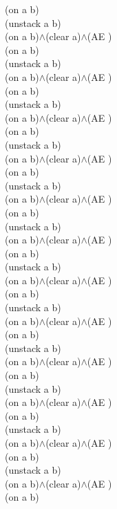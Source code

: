 {{(on a b)\\
(unstack a b)\\
(on a b)$\wedge$(clear a)$\wedge$(AE )\\
(on a b)\\
(unstack a b)\\
(on a b)$\wedge$(clear a)$\wedge$(AE )\\
(on a b)\\
(unstack a b)\\
(on a b)$\wedge$(clear a)$\wedge$(AE )\\
(on a b)\\
(unstack a b)\\
(on a b)$\wedge$(clear a)$\wedge$(AE )\\
(on a b)\\
(unstack a b)\\
(on a b)$\wedge$(clear a)$\wedge$(AE )\\
(on a b)\\
(unstack a b)\\
(on a b)$\wedge$(clear a)$\wedge$(AE )\\
(on a b)\\
(unstack a b)\\
(on a b)$\wedge$(clear a)$\wedge$(AE )\\
(on a b)\\
(unstack a b)\\
(on a b)$\wedge$(clear a)$\wedge$(AE )\\
(on a b)\\
(unstack a b)\\
(on a b)$\wedge$(clear a)$\wedge$(AE )\\
(on a b)\\
(unstack a b)\\
(on a b)$\wedge$(clear a)$\wedge$(AE )\\
(on a b)\\
(unstack a b)\\
(on a b)$\wedge$(clear a)$\wedge$(AE )\\
(on a b)\\
(unstack a b)\\
(on a b)$\wedge$(clear a)$\wedge$(AE )\\
(on a b)\\
}%
}

